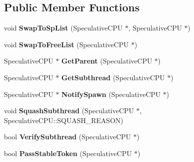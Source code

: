 \subsection*{Public Member Functions}
\begin{DoxyCompactItemize}
\item 
\hypertarget{classSpeculativeLogic_acb0f37017ed611ab21c131ed65b21702}{
void {\bfseries SwapToSpList} (SpeculativeCPU $\ast$, SpeculativeCPU $\ast$)}
\label{classSpeculativeLogic_acb0f37017ed611ab21c131ed65b21702}

\item 
\hypertarget{classSpeculativeLogic_a8e5f35ba96b8b0d8f43620550a994529}{
void {\bfseries SwapToFreeList} (SpeculativeCPU $\ast$)}
\label{classSpeculativeLogic_a8e5f35ba96b8b0d8f43620550a994529}

\item 
\hypertarget{classSpeculativeLogic_a84ae57d761581365e019cab467a9b577}{
SpeculativeCPU $\ast$ {\bfseries GetParent} (SpeculativeCPU $\ast$)}
\label{classSpeculativeLogic_a84ae57d761581365e019cab467a9b577}

\item 
\hypertarget{classSpeculativeLogic_a30a3107c14fd7196dc8874ab4177902c}{
SpeculativeCPU $\ast$ {\bfseries GetSubthread} (SpeculativeCPU $\ast$)}
\label{classSpeculativeLogic_a30a3107c14fd7196dc8874ab4177902c}

\item 
\hypertarget{classSpeculativeLogic_a6c5d1030f697921ae4a6dec57c7d9317}{
SpeculativeCPU $\ast$ {\bfseries NotifySpawn} (SpeculativeCPU $\ast$)}
\label{classSpeculativeLogic_a6c5d1030f697921ae4a6dec57c7d9317}

\item 
\hypertarget{classSpeculativeLogic_aa8e34fc7b001120855e0856d9cdd396e}{
void {\bfseries SquashSubthread} (SpeculativeCPU $\ast$, SpeculativeCPU::SQUASH\_\-REASON)}
\label{classSpeculativeLogic_aa8e34fc7b001120855e0856d9cdd396e}

\item 
\hypertarget{classSpeculativeLogic_ae61a5e6d7c9b2fb555396a5ba5aa452b}{
bool {\bfseries VerifySubthread} (SpeculativeCPU $\ast$)}
\label{classSpeculativeLogic_ae61a5e6d7c9b2fb555396a5ba5aa452b}

\item 
\hypertarget{classSpeculativeLogic_aa4eca95eca5abcdeed41287ea6581d09}{
bool {\bfseries PassStableToken} (SpeculativeCPU $\ast$)}
\label{classSpeculativeLogic_aa4eca95eca5abcdeed41287ea6581d09}


\end{DoxyCompactItemize}
